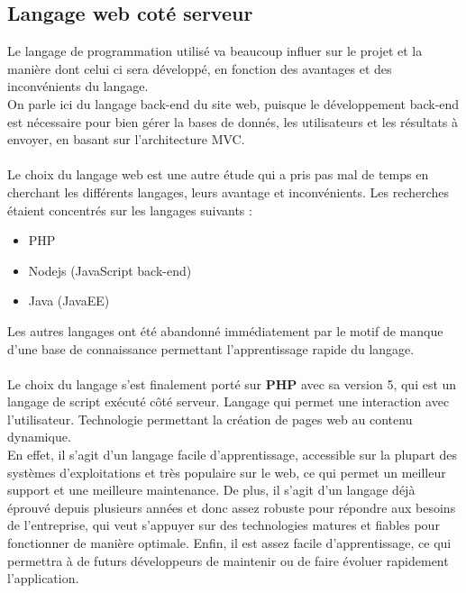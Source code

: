 \documentclass[12pt]{article}
\begin{document}
\subsection{Langage web coté serveur }
Le langage de programmation utilisé va beaucoup influer sur le projet et la manière dont celui ci sera développé, en fonction des avantages et des inconvénients du langage.\\
On parle ici du langage back-end du site web, puisque le développement back-end est nécessaire pour bien gérer 
la bases de donnés, les  utilisateurs et les résultats à envoyer, en basant sur l'architecture MVC.\\ \\
Le choix du langage web est une autre étude qui a pris pas mal de temps en cherchant les différents langages, leurs  avantage et inconvénients. Les recherches étaient concentrés sur les langages suivants :
\begin{itemize}
\item PHP
\item Nodejs (JavaScript back-end)
\item Java (JavaEE)

\end{itemize}

Les autres langages ont été abandonné immédiatement par le motif de manque d'une base de connaissance permettant
l'apprentissage rapide du langage.\\ \\

Le choix du langage s’est finalement porté sur \textbf{PHP} avec sa version 5, qui 
 est un langage de script exécuté côté serveur. Langage qui permet une interaction avec l’utilisateur. Technologie permettant la création de pages web au contenu dynamique.\\

 En effet, il s’agit d’un langage facile
d’apprentissage, accessible sur la plupart des systèmes d’exploitations et très populaire sur le
web, ce qui permet un meilleur support et une meilleure maintenance. De plus, il s’agit d’un
langage déjà éprouvé depuis plusieurs années et donc assez robuste pour répondre aux
besoins de l’entreprise, qui veut s’appuyer sur des technologies matures et fiables pour
fonctionner de manière optimale. Enfin, il est assez facile d’apprentissage, ce qui permettra à
de futurs développeurs de maintenir ou de faire évoluer rapidement l’application.\\  \\
\end{document}
